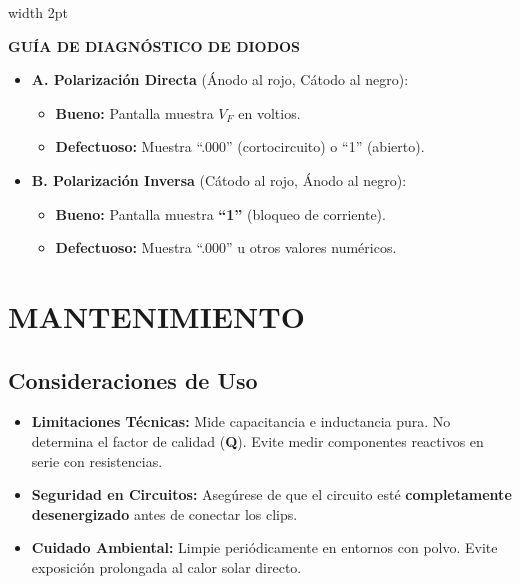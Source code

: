 \documentclass[11pt]{article}
\newcommand{\notastecnicas}[2]{%
    \vspace{6pt}
    \noindent
    \begingroup
    \color{DarkGray}
    \hspace{0.5cm}\vrule width 2pt\hspace{12pt}%
    \begin{minipage}{\dimexpr\textwidth-25pt-0.5cm\relax}
        \vspace{4pt}
        {\small\textbf{#1}}\\[0.15cm]
        \footnotesize #2
        \vspace{4pt}
    \end{minipage}
    \endgroup
    \vspace{6pt}
}
\begin{document}
\notastecnicas{GUÍA DE DIAGNÓSTICO DE DIODOS}{%
    \begin{itemize}[leftmargin=0.4cm, labelsep=0.2cm, itemsep=4pt]
        \item \textbf{A. Polarización Directa} (Ánodo al rojo, Cátodo al negro):
        \begin{itemize}[label=$\circ$, nosep]
            \item \textbf{Bueno:} Pantalla muestra $V_F$ en voltios.
            \item \textbf{Defectuoso:} Muestra ``.000'' (cortocircuito) o ``1'' (abierto).
        \end{itemize}
        \item \textbf{B. Polarización Inversa} (Cátodo al rojo, Ánodo al negro):
        \begin{itemize}[label=$\circ$, nosep]
            \item \textbf{Bueno:} Pantalla muestra \textbf{``1''} (bloqueo de corriente).
            \item \textbf{Defectuoso:} Muestra ``.000'' u otros valores numéricos.
        \end{itemize}
    \end{itemize}
}

\section{MANTENIMIENTO}

\subsection{Consideraciones de Uso}
\begin{itemize}[label=\color{IndustrialBlue}$\bullet$, leftmargin=1.2cm, itemsep=5pt]
    \item \textbf{Limitaciones Técnicas:} Mide capacitancia e inductancia pura. No determina el factor de calidad (\textbf{Q}). Evite medir componentes reactivos en serie con resistencias.
    \item \textbf{Seguridad en Circuitos:} Asegúrese de que el circuito esté \textbf{completamente desenergizado} antes de conectar los clips.
    \item \textbf{Cuidado Ambiental:} Limpie periódicamente en entornos con polvo. Evite exposición prolongada al calor solar directo.
\end{itemize}
\end{document}
